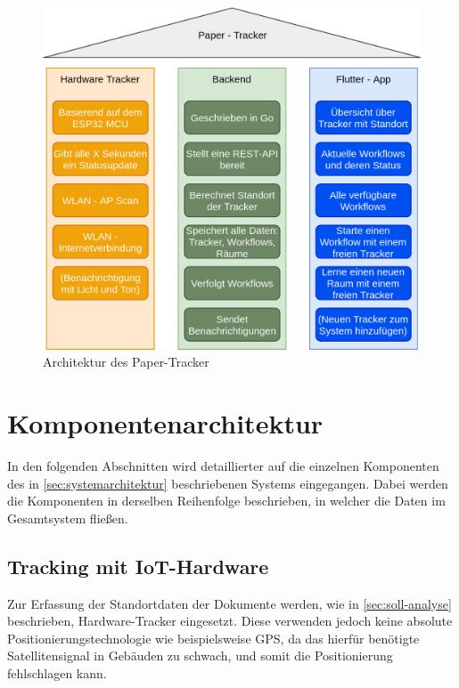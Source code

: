 \begin{figure}[h!tbp]
	\includegraphics[width=\textwidth]{images/architecture_de.png}
	\centering
	\caption{Architektur des Paper-Tracker}
	\label{fig:architecture}
\end{figure}

\section{Komponentenarchitektur} \label{sec:komponentenarchitektur}

In den folgenden Abschnitten wird detaillierter auf die einzelnen Komponenten des in
\autoref{sec:systemarchitektur} beschriebenen Systems eingegangen.
Dabei werden die Komponenten in derselben Reihenfolge beschrieben, in welcher die Daten im
Gesamtsystem fließen.

\subsection{Tracking mit IoT-Hardware} \label{sec:tracking-hardware}

Zur Erfassung der Standortdaten der Dokumente werden, wie in \autoref{sec:soll-analyse}
beschrieben, Hardware-Tracker eingesetzt.
Diese verwenden jedoch keine absolute Positionierungstechnologie wie beispielsweise \gls{GPS}, da
das hierfür benötigte Satellitensignal in Gebäuden zu schwach, und somit die Positionierung
fehlschlagen kann.

